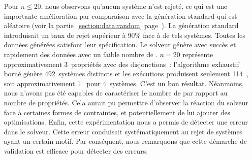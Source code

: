 Pour $n \leq 20$, nous observons qu'aucun système n'est rejeté, ce qui est une
importante amélioration par comparaison avec la génération standard qui est
aléatoire (voir la partie~\ref{section:data:random}
page~\pageref{section:data:random}). La génération standard introduisait un taux
de rejet supérieur à 90\% face à de tels systèmes. Toutes les données générées
satisfont leur spécification. Le solveur génère avec succès et rapidement des
données avec un faible nombre de . $n = 20$ représente
approximativement 3~propriétés avec des disjonctions~: l'algorithme exhaustif
borné génère 492~systèmes distincts et les exécutions produisent seulement
114~, soit approximativement 1~ pour
4~systèmes. C'est un bon résultat. Néanmoins, nous n'avons pas été capables de
caractériser le nombre de  par rapport au nombre de
propriétés. Cela aurait pu permettre d'observer la réaction du solveur face à
certaines formes de contraintes, et potentiellement de lui ajouter des
optimisations. Enfin, cette expérimentation nous a permis de détecter une erreur
dans le solveur. Cette erreur conduisait systématiquement au rejet de systèmes
ayant un certain motif. Par conséquent, nous remarquons que cette démarche de
validation est efficace pour détecter des erreurs.
